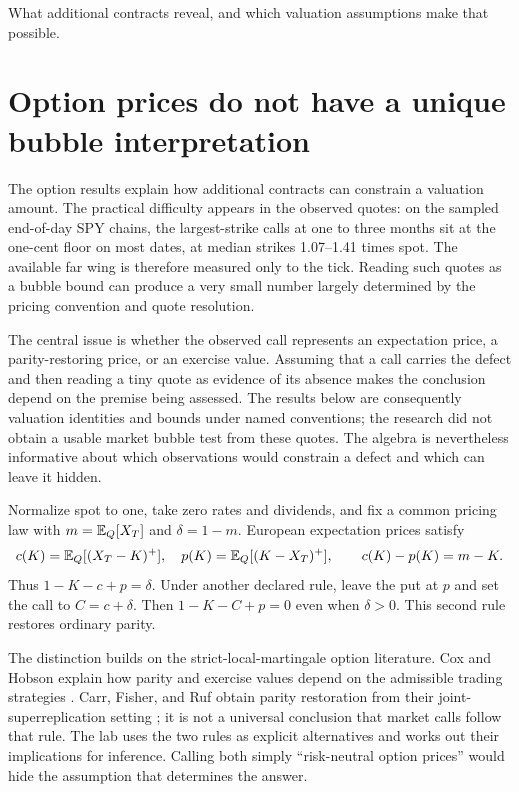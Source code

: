{What additional contracts reveal, and which valuation assumptions make that possible.}

\section{Option prices do not have a unique bubble interpretation}\label{sec:optionrules}
The option results explain how additional contracts can constrain a
valuation amount. The practical difficulty appears in the observed quotes:
on the sampled end-of-day SPY chains, the largest-strike calls at one to
three months sit at the one-cent floor on most dates, at median strikes
1.07--1.41 times spot. The available far wing is therefore measured only to
the tick. Reading such quotes as a bubble bound can produce a very small
number largely determined by the pricing convention and quote resolution.

The central issue is whether the observed call represents an expectation
price, a parity-restoring price, or an exercise value. Assuming that a call
carries the defect and then reading a tiny quote as evidence of its absence
makes the conclusion depend on the premise being assessed. The results below
are consequently valuation identities and bounds under named conventions;
the research did not obtain a usable market bubble test from these quotes.
The algebra is nevertheless informative about which observations would
constrain a defect and which can leave it hidden.

Normalize spot to one, take zero rates and dividends, and fix a common
pricing law with $m=\mathbb{E}_Q[X_T]$ and $\delta=1-m$. European expectation
prices satisfy
\begin{equation}\label{eq:parityexpect}
 c(K)=\mathbb{E}_Q[(X_T-K)^+],\quad p(K)=\mathbb{E}_Q[(K-X_T)^+],
 \qquad c(K)-p(K)=m-K.
\end{equation}
Thus $1-K-c+p=\delta$. Under another declared rule, leave the put at
$p$ and set the call to $C=c+\delta$. Then $1-K-C+p=0$ even when
$\delta>0$. This second rule restores ordinary parity.

The distinction builds on the strict-local-martingale option literature.
Cox and Hobson explain how parity and exercise values depend on the
admissible trading strategies \cite{cox2005local}.
Carr, Fisher, and Ruf obtain parity restoration from their
joint-superreplication setting \cite{carr2012hedging}; it is not a
universal conclusion that market calls follow that rule. The lab uses the
two rules as explicit alternatives and works out their implications for
inference. Calling both simply ``risk-neutral option prices'' would hide
the assumption that determines the answer.

